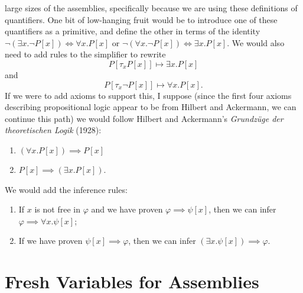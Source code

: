 \documentclass{amsart}
\begin{document}
large sizes of the assemblies, specifically because we are using these
definitions of quantifiers. One bit of low-hanging fruit would be to
introduce one of these quantifiers as a primitive, and define the other
in terms of the identity $\neg(\exists x.\neg P[x])\iff\forall x.P[x]$
or $\neg(\forall x.\neg P[x])\iff\exists x.P[x]$. We would also need to
add rules to the simplifier to rewrite
\[P[\tau_{x}P[x]]\mapsto\exists x.P[x]\]
and
\[P[\tau_{x}\neg P[x]]\mapsto\forall x.P[x].\]
If we were to add axioms to support this, I suppose (since the first
four axioms describing propositional logic appear to be from Hilbert and
Ackermann, we can continue this path) we would follow
Hilbert and Ackermann's \textit{Grundz\"{u}ge der theoretischen Logik} (1928):
\begin{enumerate}
\item $(\forall x.P[x])\implies P[x]$
\item $P[x]\implies(\exists x.P[x])$.
\end{enumerate}
We would add the inference rules:
\begin{enumerate}
\item If $x$ is not free in $\varphi$ and we have proven $\varphi\implies\psi[x]$,
  then we can infer $\varphi\implies\forall x.\psi[x]$;
\item If we have proven $\psi[x]\implies\varphi$, then we can infer
  $(\exists x.\psi[x])\implies\varphi$.
\end{enumerate}

\section{Fresh Variables for Assemblies}
\end{document}
